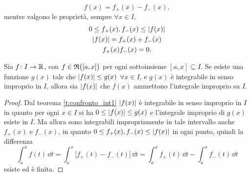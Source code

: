 \[
f(x)=f_+(x)-f_-(x),
\]
mentre valgono le proprietà, sempre $\forall x\in I$,
\[\begin{gathered}
0\leq f_+(x),f_-(x)\leq\left|{f(x)}\right|\\
\left|{f(x)}\right|=f_+(x)+f_-(x)\\
f_+(x)f_-(x)=0.
\end{gathered}\]
\begin{teorema} \label{t:confronto_int2}
Sia $f\colon I\to\mathbb{R}$, con $f\in\mathfrak{R}\big([a,x]\big)$ per ogni sottoinsieme $[a,x]\subseteq I$.
Se esiste una funzione $g(x)$ tale che $\left|{f(x)}\right|\leq g(x)$ $\forall x\in I$, e $g(x)$ è integrabile in senso improprio in $I$, allora sia $\left|{f(x)}\right|$ che $f(x)$ ammettono l'integrale improprio su $I$.
\end{teorema}
\begin{proof}
Dal teorema \ref{t:confronto_int1} $\left|{f(x)}\right|$ è integrabile in senso improprio in $I$ in quanto per ogni $x\in I$ si ha $0\leq\left|{f(x)}\right|\leq g(x)$ e l'integrale improprio di $g(x)$ esiste in $I$.
Ma allora sono integrabili impropriamente in tale intervallo anche $f_+(x)$ e $f_-(x)$, in quanto $0\leq f_+(x),f_-(x)\leq\left|{f(x)}\right|$ in ogni punto, quindi la differenza
\[
\int_a^xf(t)\,\dd t=\int_a^x\big[f_+(t)-f_-(t)\big]\,\dd t=\int_a^xf_+(t)\,\dd t-\int_a^xf_-(t)\,\dd t
\]
esiste ed è finita.
\end{proof}

